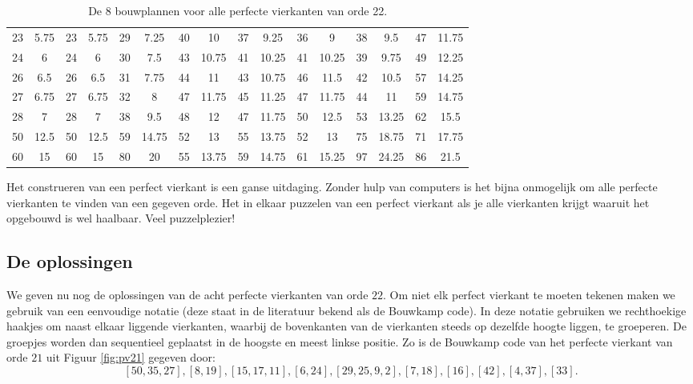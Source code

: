 \documentclass[10pt]{article}
\begin{document}
\begin{table}[ht]
\begin{tabular}{c|c||c|c||c|c||c|c||c|c||c|c||c|c||c|c}
  23 & 5.75 & 23 & 5.75 & 29 & 7.25  & 40 & 10    & 37 & 9.25  & 36 & 9     & 38 & 9.5   & 47 & 11.75  \\
  24 & 6    & 24 & 6    & 30 & 7.5   & 43 & 10.75 & 41 & 10.25 & 41 & 10.25 & 39 & 9.75  & 49 & 12.25     \\
  26 & 6.5  & 26 & 6.5  & 31 & 7.75  & 44 & 11    & 43 & 10.75 & 46 & 11.5  & 42 & 10.5  & 57 & 14.25    \\
  27 & 6.75 & 27 & 6.75 & 32 & 8     & 47 & 11.75 & 45 & 11.25 & 47 & 11.75 & 44 & 11    & 59 & 14.75   \\
  28 & 7    & 28 & 7    & 38 & 9.5   & 48 & 12    & 47 & 11.75 & 50 & 12.5  & 53 & 13.25 & 62 & 15.5     \\
  50 & 12.5 & 50 & 12.5 & 59 & 14.75 & 52 & 13    & 55 & 13.75 & 52 & 13    & 75 & 18.75 & 71 & 17.75   \\
  60 & 15   & 60 & 15   & 80 & 20    & 55 & 13.75 & 59 & 14.75 & 61 & 15.25 & 97 & 24.25 & 86 & 21.5      \\
  \end{tabular}
  \caption{De 8 bouwplannen voor alle perfecte vierkanten van orde 22.}
  \label{tbl:bouwplan:22}
\end{table}

Het construeren van een perfect vierkant is een ganse uitdaging. Zonder hulp van computers is het bijna onmogelijk om alle perfecte vierkanten te vinden van een gegeven orde. Het in elkaar puzzelen van een perfect vierkant als je alle vierkanten krijgt waaruit het opgebouwd is wel haalbaar. Veel puzzelplezier!

\subsection*{De oplossingen}

We geven nu nog de oplossingen van de acht perfecte vierkanten van orde $22$. Om niet elk perfect vierkant te moeten tekenen maken we gebruik van een eenvoudige notatie (deze staat in de literatuur bekend als de Bouwkamp code). In deze notatie gebruiken we rechthoekige haakjes om naast elkaar liggende vierkanten, waarbij de bovenkanten van de vierkanten steeds op dezelfde hoogte liggen, te groeperen. De groepjes worden dan sequentieel geplaatst in de hoogste en meest linkse positie. Zo is de Bouwkamp code van het perfecte vierkant van orde $21$ uit Figuur \ref{fig:pv21} gegeven door:
$$
[50, 35, 27], [8, 19], [15, 17, 11], [6, 24], [29, 25, 9, 2], [7, 18], [16], [42], [4, 37], [33].
$$
\end{document}
